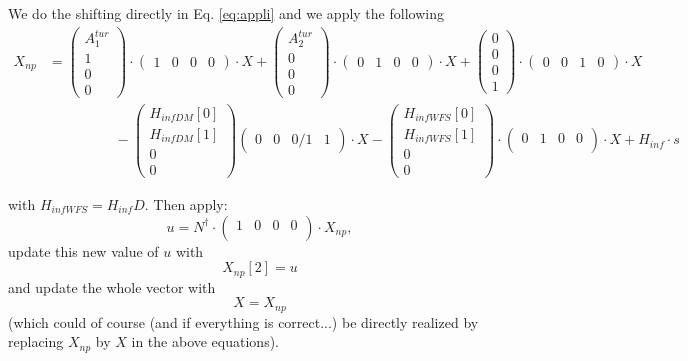 \documentclass[a4,10pt]{article}
\begin{document}
We do the shifting directly in Eq. \ref{eq:appli}
and we apply the following
\begin{align}
X_{np} &= \begin{pmatrix}
A_{1}^{tur} \\
1\\
0\\
0\end{pmatrix}\cdot \begin{pmatrix}
1 & 0 & 0 & 0\end{pmatrix}\cdot X + \begin{pmatrix}
A_{2}^{tur} \\
0\\
0\\
0\end{pmatrix}\cdot \begin{pmatrix}
0 & 1 & 0 & 0\end{pmatrix}\cdot X + \begin{pmatrix}
0\\
0\\
0\\
1\end{pmatrix}\cdot\begin{pmatrix}
0 & 0 & 1 & 0\end{pmatrix}\cdot X \nonumber \\
&\hspace{2cm} - \begin{pmatrix}H_{infDM}[0]\\ H_{infDM}[1]\\ 0 \\ 0\end{pmatrix}
\begin{pmatrix}
0 & 0 & 0/1 & 1\end{pmatrix}\cdot X - \begin{pmatrix}H_{infWFS}[0]\\H_{infWFS}[1]\\0\\0\end{pmatrix} \cdot \left( \begin{array}{cccc} 0 & 1 & 0 & 0\\ \end{array}\right) \cdot X
+ H_{inf} \cdot s
\label{eq:appli}
\end{align}

with $H_{infWFS}=H_{inf}D$. Then apply:
\begin{equation}
u = N^{\dag} \cdot \left( \begin{array}{cccc}
  1&0&0&0\\ \end{array}\right)\cdot X_{np},
\end{equation}
update this new value of $u$ with
\begin{equation}
X_{np}[2]=u
\end{equation}
and update the whole vector with
\begin{equation}
X=X_{np}
\end{equation}
(which could of course (and if everything is correct...) be directly realized by replacing $X_{np}$ by $X$ in the above equations).
\end{document}
